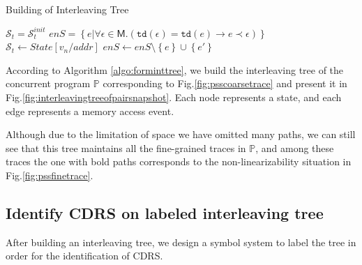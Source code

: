\documentclass[runningheads]{llncs}
\newcommand{\pair}[1]{{\langle{#1}\rangle}}
\newcommand{\sset}[1]{\left\{{#1}\right\}}
\begin{document}
\vspace{-0.5cm}


\begin{algorithm}
    \caption{Building of Interleaving Tree}\label{algo:forminttree}
    \begin{algorithmic}[1]
        \State $\mathcal{S}_t = \mathcal{S}_t^{init}$
        \State $\mathit{enS} = \left\{ e | \forall \epsilon\in \mathsf{M} .(\mathtt{td}(\epsilon)=\mathtt{td}(e)\longrightarrow e\prec \epsilon)\right\}$
            \State {}
            \For{$e(addr,v_n)^{\pair{o,t}} \leftarrow \mathit{enS}$}
                \State {}
                \State $\mathcal{S}_t \gets \mathit{State[v_n/addr]}$
                \State $\mathit{enS} \gets \mathit{enS}\setminus \sset{e} \cup \sset{e'}$
                \State {}
            \EndFor
        \EndFunction
    \end{algorithmic}
\end{algorithm}

\vspace{-0.8cm}

\begin{example} 
According to Algorithm \ref{algo:forminttree}, we build the interleaving tree of the concurrent program $\mathbb{P}$ corresponding to Fig.\ref{fig:psscoarsetrace} and present it in Fig.\ref{fig:interleavingtreeofpairsnapshot}. Each node represents a state, and each edge represents a memory access event.

Although due to the limitation of space we have omitted many paths, we can still see that this tree maintains all the fine-grained traces in $\mathbb{P}$, and among these traces the one with bold paths corresponds to 
the non-linearizability situation in Fig.\ref{fig:pssfinetrace}.



\end{example}






\subsection{Identify CDRS on labeled interleaving tree}\label{sec:identifycdrs}
After building an interleaving tree, we design a symbol system to label the tree in order for the identification of CDRS.
\end{document}
